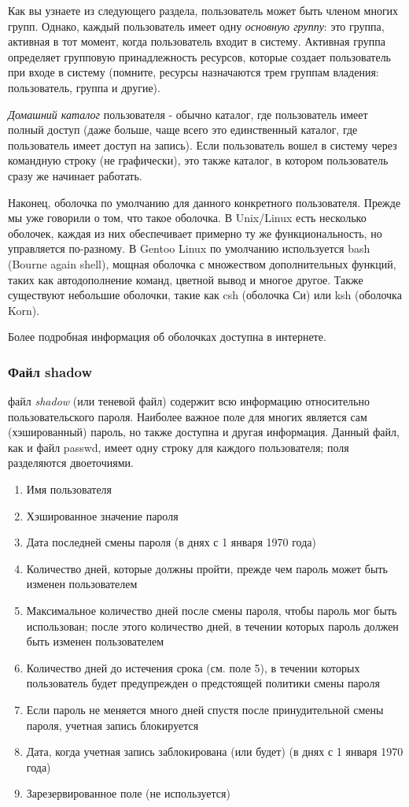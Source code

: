 \documentclass[10pt]{book}
\begin{document}
Как вы узнаете из следующего раздела, пользователь может быть членом многих групп. Однако, каждый пользователь имеет одну \textit{основную группу}: это группа, активная в тот момент, когда пользователь входит в систему. Активная группа определяет групповую принадлежность ресурсов, которые создает пользователь при входе в систему (помните, ресурсы назначаются трем группам владения: пользователь, группа и другие). 

\textit{Домашний каталог} пользователя - обычно каталог, где пользователь имеет полный доступ (даже больше, чаще всего это единственный каталог, где пользователь имеет доступ на запись). Если пользователь вошел в систему через командную строку (не графически), это также каталог, в котором пользователь сразу же начинает работать. 

Наконец, оболочка по умолчанию для данного конкретного пользователя. Прежде мы уже говорили о том, что такое оболочка. В Unix/Linux есть несколько оболочек, каждая из них обеспечивает примерно ту же функциональность, но управляется по-разному. В Gentoo Linux по умолчанию используется bash (Bourne again shell), мощная оболочка с множеством дополнительных функций, таких как автодополнение команд, цветной вывод и многое другое. Также существуют небольшие оболочки, такие как csh (оболочка Си) или ksh (оболочка Korn). 

Более подробная информация об оболочках доступна в интернете.

\subsubsection{Файл shadow}
 
файл \textit{shadow} (или теневой файл) содержит всю информацию относительно пользовательского пароля. Наиболее важное поле для многих является сам (хэшированный) пароль, но также доступна и другая информация. Данный файл, как и файл passwd, имеет одну строку для каждого пользователя; поля разделяются двоеточиями. 
\begin{enumerate}
\item Имя пользователя 
\item Хэшированное значение пароля 
\item Дата последней смены пароля (в днях с 1 января 1970 года) 
\item Количество дней, которые должны пройти, прежде чем пароль может быть изменен пользователем 
\item Максимальное количество дней после смены пароля, чтобы пароль мог быть использован; после этого количество дней, в течении которых пароль должен быть изменен пользователем 
\item Количество дней до истечения срока (см. поле 5), в течении которых пользователь будет предупрежден о предстоящей политики смены пароля  
\item Если пароль не меняется много дней спустя после принудительной смены пароля, учетная запись блокируется 
\item Дата, когда учетная запись заблокирована (или будет) (в днях с 1 января 1970 года) 
\item Зарезервированное поле (не используется)
\end{enumerate}
\end{document}
